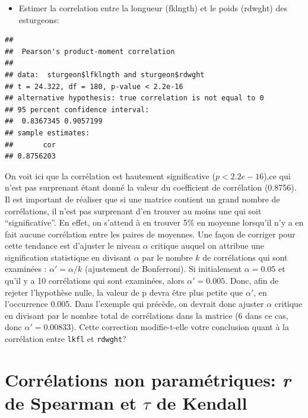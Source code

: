 \documentclass[
  12pt,
]{book}
\newenvironment{Shaded}{\begin{snugshade}}{\end{snugshade}}
\newcommand{\DataTypeTok}[1]{\textcolor[rgb]{0.13,0.29,0.53}{#1}}
\newcommand{\KeywordTok}[1]{\textcolor[rgb]{0.13,0.29,0.53}{\textbf{#1}}}
\newcommand{\NormalTok}[1]{#1}
\newcommand{\OperatorTok}[1]{\textcolor[rgb]{0.81,0.36,0.00}{\textbf{#1}}}
\newcommand{\StringTok}[1]{\textcolor[rgb]{0.31,0.60,0.02}{#1}}
\providecommand{\tightlist}{%
  \setlength{\itemsep}{0pt}\setlength{\parskip}{0pt}}
\begin{document}
\begin{itemize}
\tightlist
\item
  Estimer la correlation entre la longueur (fklngth) et le poids (rdwght) des esturgeons:
\end{itemize}

\begin{Shaded}
\end{Shaded}

\begin{verbatim}
## 
##  Pearson's product-moment correlation
## 
## data:  sturgeon$lfklngth and sturgeon$rdwght
## t = 24.322, df = 180, p-value < 2.2e-16
## alternative hypothesis: true correlation is not equal to 0
## 95 percent confidence interval:
##  0.8367345 0.9057199
## sample estimates:
##       cor 
## 0.8756203
\end{verbatim}

On voit ici que la corrélation est hautement significative (\(p < 2.2e-16\)),ce qui n'est pas surprenant étant donné la valeur du coefficient de corrélation (0.8756).
Il est important de réaliser que si une matrice contient un grand nombre de corrélations, il n'est pas surprenant d'en trouver au moins une qui soit ``significative''.
En effet, on s'attend à en trouver 5\% en moyenne lorsqu'il n'y a en fait aucune corrélation entre les paires de moyennes.
Une façon de corriger pour cette tendance est d'ajuster le niveau \(\alpha\) critique auquel on attribue une signification statistique en divisant \(\alpha\) par le nombre \(k\) de corrélations qui sont examinées : \(\alpha' = \alpha / k\) (ajustement de Bonferroni). Si initialement \(\alpha = 0.05\) et qu'il y a 10 corrélations qui sont examinées, alors \(\alpha'= 0.005\).
Donc, afin de rejeter l'hypothèse nulle, la valeur de p devra être plus petite que \(\alpha'\), en l'occurrence 0.005.
Dans l'exemple qui précède, on devrait donc ajuster \(\alpha\) critique en divisant par le nombre total de corrélations dans la matrice (6 dans ce cas, donc \(\alpha'=0.00833\)).
Cette correction modifie-t-elle votre conclusion quant à la corrélation entre \texttt{lkfl} et \texttt{rdwght}?

\hypertarget{corruxe9lations-non-paramuxe9triques-r-de-spearman-et-tau-de-kendall}{%
\section{\texorpdfstring{Corrélations non paramétriques: \emph{r} de Spearman et \(\tau\) de Kendall}{Corrélations non paramétriques: r de Spearman et \textbackslash tau de Kendall}}\label{corruxe9lations-non-paramuxe9triques-r-de-spearman-et-tau-de-kendall}}
\end{document}
